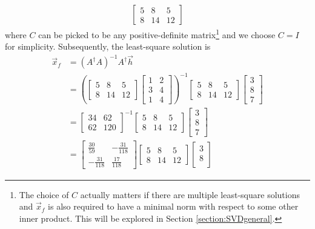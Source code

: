\begin{solution}
\begin{align*}
\begin{bmatrix}
5&8&5\\ 
8&14&12
\end{bmatrix}
\end{align*}
where $C$ can be picked to be any positive-definite matrix\footnote{The choice of $C$ actually matters if there are multiple least-square solutions and $\vec{x}_f$ is also required to have a minimal norm with respect to some other inner product. This will be explored in Section \ref{section:SVDgeneral}.} and we choose $C = I$ for simplicity. Subsequently, the least-square solution is
\begin{align*}
\vec{x}_f &= (A^\dag A)^{-1}A^\dag \vec{h} \\
&=
\left(\begin{bmatrix}
5&8&5\\ 
8&14&12
\end{bmatrix}
\begin{bmatrix}
1 & 2 \\
3 & 4 \\
1 & 4
\end{bmatrix}\right)^{-1}
\begin{bmatrix}
5&8&5\\ 
8&14&12
\end{bmatrix}
\begin{bmatrix}
3 \\
8 \\
7
\end{bmatrix} \\
&=
\begin{bmatrix}
34&62\\ 
62&120
\end{bmatrix}^{-1}
\begin{bmatrix}
5&8&5\\ 
8&14&12
\end{bmatrix}
\begin{bmatrix}
3 \\
8 \\
7
\end{bmatrix} \\
&= 
\begin{bmatrix}
\frac{30}{59}&-\frac{31}{118}\\ 
-\frac{31}{118}&\frac{17}{118}
\end{bmatrix}
\begin{bmatrix}
5&8&5\\ 
8&14&12
\end{bmatrix}
\begin{bmatrix}
3 \\
8 \\

\end{bmatrix}
\end{align*}
\end{solution}
